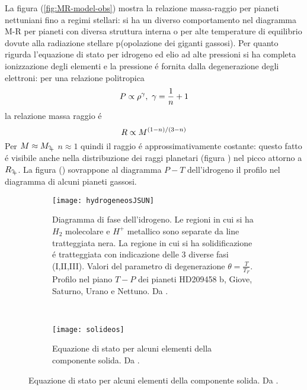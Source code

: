 La figura (\ref{fig:MR-model-obs}) mostra la relazione massa-raggio per pianeti nettuniani fino a regimi stellari: si ha un diverso comportamento nel diagramma M-R per pianeti con diversa struttura interna o per alte temperature di equilibrio dovute alla radiazione stellare p(opolazione dei giganti gassosi).
Per quanto rigurda l'equazione di stato per idrogeno ed elio ad alte pressioni si ha completa ionizzazione degli elementi e la pressione \'e fornita dalla degenerazione degli elettroni: per una relazione politropica
\begin{equation}
P\propto\rho\expy{\gamma},\ \gamma=\frac{1}{n}+1
\end{equation}
la relazione massa raggio \'e
\begin{equation}
R\propto M^{(1-n)/(3-n)}
\end{equation}
Per $M\approx\mjupiter$ $n\approx1$ quindi il raggio \'e approssimativamente costante: questo fatto \'e visibile anche nella distribuzione dei raggi planetari (figura ) nel picco attorno a $\rjupiter$. La figura () sovrappone al diagramma $P-T$ dell'idrogeno il profilo nel diagramma di alcuni pianeti gassosi.
\begin{figure}[!ht]
	\begin{subfigure}[t]{0.49\textwidth}
		\centering
		\texttt{[image: hydrogeneosJSUN]}
		\caption{Diagramma di fase dell'idrogeno. Le regioni in cui si ha $H_2$ molecolare e $H^+$ metallico sono separate da line tratteggiata nera. La regione in cui si ha solidificazione \'e tratteggiata con indicazione delle 3 diverse fasi (I,II,III). Valori del parametro di degenerazione $\theta=\frac{T}{T_F}$. Profilo nel piano $T-P$ dei pianeti HD209458 b, Giove, Saturno, Urano e Nettuno. Da \cite{guillot2005interiors}.}\label{fig:hydrogeneosJSUN}
	\end{subfigure}
	~
	\begin{subfigure}[b]{0.49\textwidth} \centering
		\texttt{[image: solideos]}
		\caption{Equazione di stato per alcuni elementi della componente solida. Da \cite{howard2012planet}.}\label{fig:solideos}
	\end{subfigure}
\end{figure}

